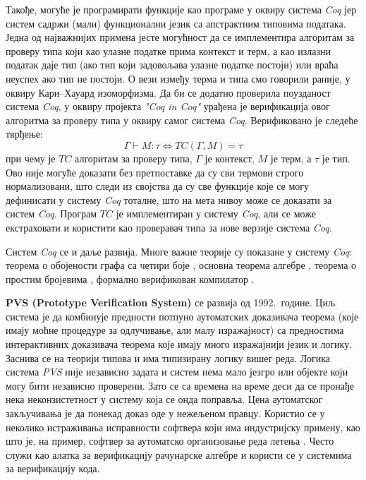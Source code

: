 Такође, могуће је програмирати функције као програме у оквиру система
\emph{Coq} јер систем садржи (мали) функционални језик са апстрактним
типовима података. Једна од најважнијих примена јесте могућност да се
имплементира алгоритам за проверу типа који као улазне податке прима
контекст и терм, а као излазни податак даје тип (ако тип који
задовољава улазне податке постоји) или враћа неуспех ако тип не
постоји. О вези између терма и типа смо говорили раније, у оквиру
Кари--Хауард изоморфизма. Да би се додатно проверила поузданост
система \emph{Coq}, у оквиру пројекта \emph{"Coq in Coq"}
\cite{barras1999auto} урађена је верификација овог алгоритма за
проверу типа у оквиру самог система \emph{Coq}. Верификовано је
следеће тврђење:
$$\Gamma \vdash M : \tau \Leftrightarrow TC(\Gamma, M) = \tau$$ при
чему је $TC$ алгоритам за проверу типа, $\Gamma$ је контекст, $M$ је
терм, а $\tau$ је тип. Ово није могуће доказати без претпоставке да су
сви термови строго нормализовани, што следи из својства да су све
функције које се могу дефинисати у систему \emph{Coq} тоталне, што на
мета нивоу може се доказати за систем \emph{Coq}. Програм $TC$ је
имплементиран у систему \emph{Coq}, али се може екстраховати и
користити као проверавач типа за нове верзије система \emph{Coq}.


Систем \emph{Coq} се и даље развија. Многе важне теорије су показане у
систему \emph{Coq}: теорема о обојености графа са четири боје
\cite{gonthier2008formal}, основна теорема алгебре
\cite{geuvers2000constructive}, теорема о простим бројевима
\cite{gonthier2013machine}, формално верификован компилатор
\cite{leroy2009formally}.

\textbf{PVS (Prototype Verification System)} \cite{pvs} се развија од
1992.~године. Циљ система је да комбинује предности потпуно
аутоматских доказивача теорема (које имају моћне процедуре за
одлучивање, али малу изражајност) са предностима интерактивних
доказивача теорема које имају много изражајнији језик и
логику. Заснива се на теорији типова и има типизирану логику вишег
реда. Логика система \emph{PVS} није независно задата и систем нема
мало језгро или објекте који могу бити независно проверени. Зато се са
времена на време деси да се пронађе нека неконзистетност у систему
која се онда поправља. Цена аутоматског закључивања је да понекад
доказ оде у нежељеном правцу. Користио се у неколико истраживања
исправности софтвера који има индустријску примену, као што је, на
пример, софтвер за аутоматско организовање реда летења
\cite{pvs2}. Често служи као алатка за верификацију рачунарске алгебре
и користи се у системима за верификацију кода.

